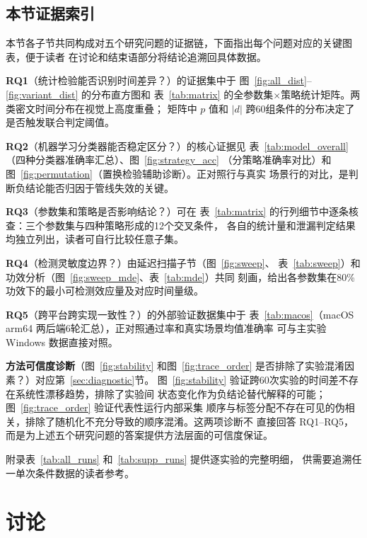 \documentclass[a4paper,fontset=none]{ctexart}
\begin{document}
\subsection{本节证据索引}
\label{sec:results_summary}

本节各子节共同构成对五个研究问题的证据链，下面指出每个问题对应的关键图表，便于读者
在讨论和结束语部分将结论追溯回具体数据。

\textbf{RQ1}（统计检验能否识别时间差异？）的证据集中于
图~\ref{fig:all_dist}--\ref{fig:variant_dist} 的分布直方图和
表~\ref{tab:matrix} 的全参数集$\times$策略统计矩阵。两类密文时间分布在视觉上高度重叠；
矩阵中 $p$ 值和 $|d|$ 跨60组条件的分布决定了是否触发联合判定阈值。

\textbf{RQ2}（机器学习分类器能否稳定区分？）的核心证据见
表~\ref{tab:model_overall}（四种分类器准确率汇总）、图~\ref{fig:strategy_acc}
（分策略准确率对比）和图~\ref{fig:permutation}（置换检验辅助诊断）。正对照行与真实
场景行的对比，是判断负结论能否归因于管线失效的关键。

\textbf{RQ3}（参数集和策略是否影响结论？）可在
表~\ref{tab:matrix} 的行列细节中逐条核查：三个参数集与四种策略形成的12个交叉条件，
各自的统计量和泄漏判定结果均独立列出，读者可自行比较任意子集。

\textbf{RQ4}（检测灵敏度边界？）由延迟扫描子节（图~\ref{fig:sweep}、
表~\ref{tab:sweep}）和功效分析（图~\ref{fig:sweep_mde}、表~\ref{tab:mde}）共同
刻画，给出各参数集在80\%功效下的最小可检测效应量及对应时间量级。

\textbf{RQ5}（跨平台跨实现一致性？）的外部验证数据集中于
表~\ref{tab:macos}（macOS arm64 两后端6轮汇总），正对照通过率和真实场景均值准确率
可与主实验 Windows 数据直接对照。

\textbf{方法可信度诊断}（图~\ref{fig:stability} 和图~\ref{fig:trace_order}
是否排除了实验混淆因素？）对应第~\ref{sec:diagnostic}节。
图~\ref{fig:stability} 验证跨60次实验的时间差不存在系统性漂移趋势，排除了实验间
状态变化作为负结论替代解释的可能；图~\ref{fig:trace_order} 验证代表性运行内部采集
顺序与标签分配不存在可见的伪相关，排除了随机化不充分导致的顺序混淆。这两项诊断不
直接回答 RQ1--RQ5，而是为上述五个研究问题的答案提供方法层面的可信度保证。

附录表~\ref{tab:all_runs} 和~\ref{tab:supp_runs} 提供逐实验的完整明细，
供需要追溯任一单次条件数据的读者参考。

\section{讨论}
\label{sec:discussion}
\end{document}

